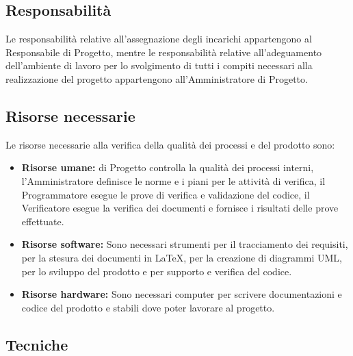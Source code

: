 	\subsection{Responsabilità}
	Le responsabilità relative all'assegnazione degli incarichi appartengono al Responsabile di Progetto, mentre le responsabilità relative all'adeguamento dell'ambiente di lavoro per lo svolgimento di tutti i compiti necessari alla realizzazione del progetto appartengono all'Amministratore di Progetto.

	\subsection{Risorse necessarie}
	Le risorse necessarie alla verifica della qualità dei processi e del prodotto sono:
		\begin{itemize}
  			\item \textbf{Risorse umane:} \textnormal{di Progetto controlla la qualità dei processi interni, l'Amministratore definisce le norme e i piani per le attività di verifica, il Programmatore esegue le prove di verifica e validazione del codice, il Verificatore esegue la verifica dei documenti e fornisce i risultati delle prove effettuate.}
  			\item \textbf{Risorse software:} \textnormal{Sono necessari strumenti per il tracciamento dei requisiti, per la stesura dei documenti in \LaTeX, per la creazione di diagrammi UML, per lo sviluppo del prodotto e per supporto e verifica del codice.}
  			\item \textbf{Risorse hardware:} \textnormal{Sono necessari computer per scrivere documentazioni e codice del prodotto e stabili dove poter lavorare al progetto.}
		\end{itemize}

	\subsection{Tecniche}
